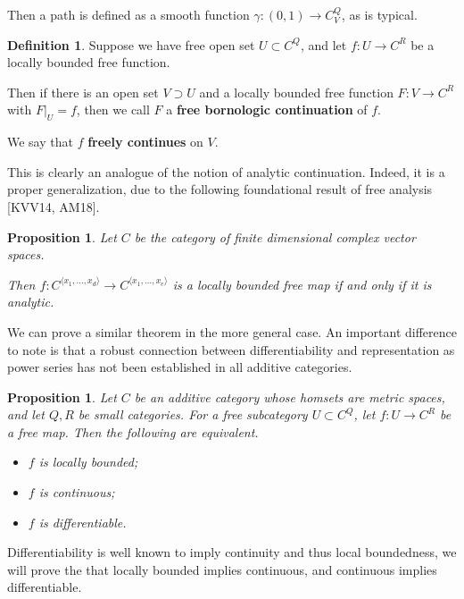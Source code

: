 \documentclass[12pt]{amsart}
\newtheorem{proposition}[theorem]{Proposition}
\theoremstyle{definition}
\newtheorem{definition}[theorem]{Definition}
\numberwithin{equation}{section}
\begin{document}
Then a path is defined as a smooth function $\gamma: (0,1) \rightarrow C^Q_V$, as is typical.

\begin{definition}
    Suppose we have free open set $U \subset C^Q$, and let $f: U\rightarrow C^R$ be a locally bounded free function.

    Then if there is an open set $V \supset U$ and a locally bounded free function $F: V \rightarrow C^R$ with $F|_{U} = f$, then we call $F$ a \textbf{free bornologic continuation} of $f$. 

    We say that $f$ \textbf{freely continues} on $V$.
\end{definition}

This is clearly an analogue of the notion of analytic continuation. Indeed, it is a proper generalization, due to the following foundational result of free analysis [KVV14, AM18].

\begin{proposition}
    Let $C$ be the category of finite dimensional complex vector spaces. 

    Then $f: C^{\langle x_1, \dots, x_d\rangle} \rightarrow C^{\langle x_1, \dots, x_e\rangle}$ is a locally bounded free map if and only if it is analytic. 
\end{proposition}

We can prove a similar theorem in the more general case. An important difference to note is that a robust connection between differentiability and representation as power series has not been established in all additive categories.

\begin{proposition}
    Let $C$ be an additive category whose homsets are metric spaces, and let $Q, R$ be small categories. For a free subcategory $U \subset C^Q$, let $f: U \rightarrow C^R$ be a free map. Then the following are equivalent.
    \begin{itemize}
        \item $f$ is locally bounded;
        \item $f$ is continuous; 
        \item $f$ is differentiable.
    \end{itemize}
\end{proposition}

Differentiability is well known to imply continuity and thus local boundedness, we will prove the that locally bounded implies continuous, and continuous implies differentiable. 
\end{document}
